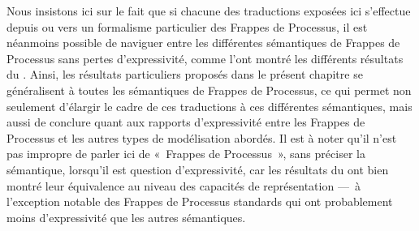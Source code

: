 Nous insistons ici sur le fait que si chacune des traductions exposées ici
s'effectue depuis ou vers un formalisme particulier des Frappes de Processus,
il est néanmoins possible de naviguer entre les différentes sémantiques de Frappes
de Processus sans pertes d'expressivité, comme l'ont montré
les différents résultats du .
Ainsi, les résultats particuliers proposés dans le présent chapitre
se généralisent à toutes les sémantiques de Frappes de Processus,
ce qui permet non seulement d'élargir le cadre de ces traductions
à ces différentes sémantiques,
mais aussi de conclure quant aux rapports d'expressivité entre les Frappes de Processus
et les autres types de modélisation abordés.
Il est à noter qu'il n'est pas impropre de parler ici de «~Frappes de Processus~»,
sans préciser la sémantique, lorsqu'il est question d'expressivité,
car les résultats du  ont bien montré leur équivalence au niveau
des capacités de représentation ---~à l'exception notable des Frappes de Processus standards
qui ont probablement moins d'expressivité que les autres sémantiques.
